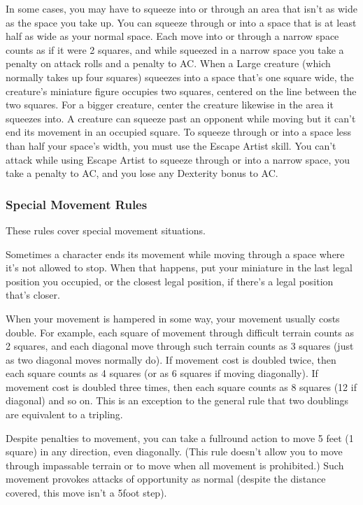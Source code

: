 In some cases, you may have to squeeze into or through an area that isn't as wide as the space you take up. You can squeeze through or into a space that is at least half as wide as your normal space. Each move into or through a narrow space counts as if it were 2 squares, and while squeezed in a narrow space you take a  penalty on attack rolls and a  penalty to AC. When a Large creature (which normally takes up four squares) squeezes into a space that's one square wide, the creature's miniature figure occupies two squares, centered on the line between the two squares. For a bigger creature, center the creature likewise in the area it squeezes into. A creature can squeeze past an opponent while moving but it can't end its movement in an occupied square. To squeeze through or into a space less than half your space's width, you must use the Escape Artist skill. You can't attack while using Escape Artist to squeeze through or into a narrow space, you take a  penalty to AC, and you lose any Dexterity bonus to AC.

\subsubsection{Special Movement Rules}

These rules cover special movement situations.

\vspace*{10pt}

Sometimes a character ends its movement while moving through a space where it's not allowed to stop. When that happens, put your miniature in the last legal position you occupied, or the closest legal position, if there's a legal position that's closer.

When your movement is hampered in some way, your movement usually costs double. For example, each square of movement through difficult terrain counts as 2 squares, and each diagonal move through such terrain counts as 3 squares (just as two diagonal moves normally do). If movement cost is doubled twice, then each square counts as 4 squares (or as 6 squares if moving diagonally). If movement cost is doubled three times, then each square counts as 8 squares (12 if diagonal) and so on. This is an exception to the general rule that two doublings are equivalent to a tripling.

Despite penalties to movement, you can take a full\textendash round action to move 5 feet (1 square) in any direction, even diagonally. (This rule doesn't allow you to move through impassable terrain or to move when all movement is prohibited.) Such movement provokes attacks of opportunity as normal (despite the distance covered, this move isn't a 5\textendash foot step).

